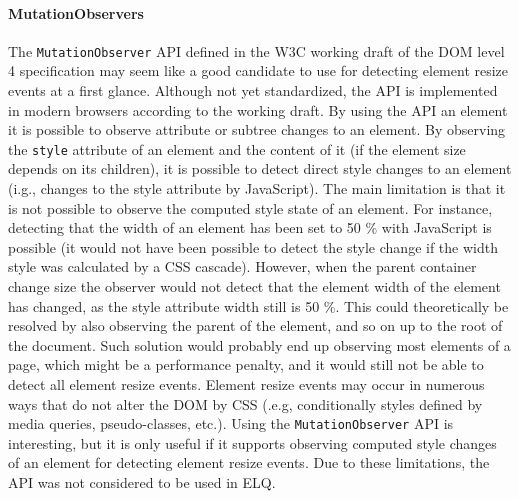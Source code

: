 \documentclass[a4paper,11pt]{kth-mag}
\newcommand{\code}[1]{\texttt{#1}}
\begin{document}
        \paragraph{MutationObservers}
        The \code{MutationObserver} \gls{API} defined in the W3C working draft of the DOM level 4 specification \cite{w3c_dom_4} may seem like a good candidate to use for detecting \gls{element} resize events at a first glance.
        Although not yet standardized, the \gls{API} is implemented in modern \glspl{browser} according to the working draft.
        By using the \gls{API} an \gls{element} it is possible to observe attribute or subtree changes to an \gls{element}.
        By observing the \code{style} attribute of an \gls{element} and the content of it (if the \gls{element} size depends on its children), it is possible to detect direct style changes to an \gls{element} (i.g., changes to the style attribute by \gls{JavaScript}).
        The main limitation is that it is not possible to observe the computed style state of an \gls{element}.
        For instance, detecting that the width of an \gls{element} has been set to 50 \% with \gls{JavaScript} is possible (it would not have been possible to detect the style change if the width style was calculated by a CSS cascade).
        However, when the parent container change size the observer would not detect that the \gls{element} width of the \gls{element} has changed, as the style attribute width still is 50 \%.
        This could theoretically be resolved by also observing the parent of the \gls{element}, and so on up to the root of the \gls{document}.
        Such solution would probably end up observing most \glspl{element} of a page, which might be a performance penalty, and it would still not be able to detect all element resize events.
        Element resize events may occur in numerous ways that do not alter the \gls{DOM} by CSS (.e.g, conditionally styles defined by \gls{media queries}, pseudo-classes, etc.).
        Using the \code{MutationObserver} \gls{API} is interesting, but it is only useful if it supports observing computed style changes of an element for detecting element resize events.
        Due to these limitations, the \gls{API} was not considered to be used in \gls{ELQ}.

\end{document}
